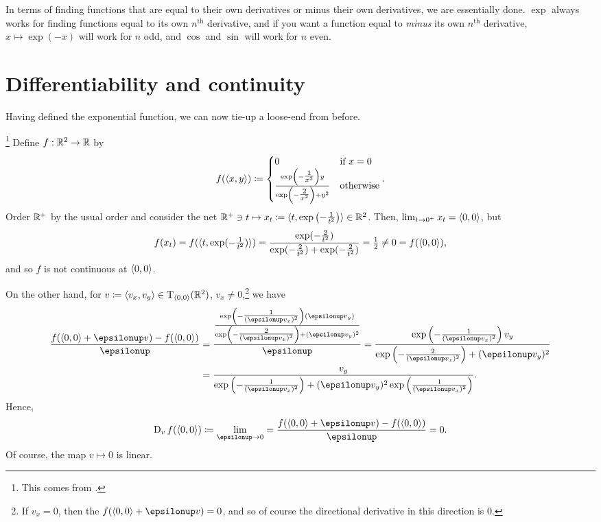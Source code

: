 In terms of finding functions that are equal to their own derivatives or minus their own derivatives, we are essentially done.  $\exp$ always works for finding functions equal to its own $n^{\text{th}}$ derivative, and if you want a function equal to \emph{minus} its own $n^{\text{th}}$ derivative, $x\mapsto \exp (-x)$ will work for $n$ odd, and $\cos$ and $\sin$ will work for $n$ even.

\section{Differentiability and continuity}


Having defined the exponential function, we can now tie-up a loose-end from before.
\begin{exm}\footnote{This comes from \cite[pg.~116]{Gelbaum}.}\label{exm6.2.15}
Define $f:\R ^2\rightarrow \R$ by
\begin{equation}
f(\coord{x,y})\coloneqq \begin{cases}0 & \text{if }x=0 \\ \frac{\exp \left( -\tfrac{1}{x^2}\right) y}{\exp \left( -\tfrac{2}{x^2}\right) +y^2} & \text{otherwise}\end{cases}.
\end{equation}
Order $\R ^+$ by the usual order and consider the net $\R ^+\ni t\mapsto x_t\coloneqq \coord{t,\exp \left( -\frac{1}{t^2}\right) }\in \R ^2$.  Then, $\lim _{t\to 0^+}x_t=\coord{0,0}$, but
\begin{equation}
f(x_t)=f(\coord{t,\exp (-\tfrac{1}{t^2})})=\frac{\exp (-\tfrac{2}{t^2})}{\exp (-\tfrac{2}{t^2})+\exp (-\tfrac{2}{t^2})}=\tfrac{1}{2}\neq 0=f(\coord{0,0}),
\end{equation}
and so $f$ is not continuous at $\coord{0,0}$.

On the other hand, for $v\coloneqq \coord{v_x,v_y}\in \tangent{\R ^2}{\coord{0,0}}$, $v_x\neq 0$,\footnote{If $v_x=0$, then the $f(\coord{0,0}+\epsilon v)=0$, and so of course the directional derivative in this direction is $0$.} we have
\begin{equation}
\begin{split}
\frac{f(\coord{0,0}+\epsilon v)-f(\coord{0,0})}{\epsilon} & =\frac{\frac{\exp \left( -\tfrac{1}{(\epsilon v_x)^2}\right) (\epsilon v_y)}{\exp \left(-\tfrac{2}{(\epsilon v_x)^2}\right) +(\epsilon v_y)^2}}{\epsilon}=\frac{\exp \left( -\tfrac{1}{(\epsilon v_x)^2}\right) v_y}{\exp \left( -\tfrac{2}{(\epsilon v_x)^2}\right) +(\epsilon v_y)^2} \\
& =\frac{v_y}{\exp \left( -\tfrac{1}{(\epsilon v_x)^2}\right) +(\epsilon v_y)^2\exp \left( \tfrac{1}{(\epsilon v_x)^2}\right) }.
\end{split}
\end{equation}
Hence,
\begin{equation}
\D _vf(\coord{0,0})\coloneqq \lim _{\epsilon \to 0}=\frac{f(\coord{0,0}+\epsilon v)-f(\coord{0,0})}{\epsilon}=0.
\end{equation}
Of course, the map $v\mapsto 0$ is linear.


\end{exm}
